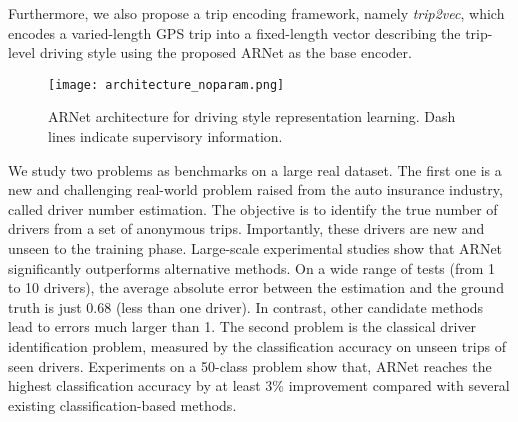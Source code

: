 \documentclass{article}
\begin{document}
Furthermore, we also propose a trip encoding framework, namely \emph{trip2vec}, which encodes a varied-length GPS trip into a fixed-length vector describing the trip-level driving style using the proposed ARNet as the base encoder.

\begin{figure}[!t]
\centering
\texttt{[image: architecture\_noparam.png]}
\vspace{-0.1in}
\caption{ARNet architecture for driving style representation learning.
Dash lines indicate supervisory information.}
\label{fig:architecture}
\vspace{-0.15in}
\end{figure}


We study two problems as benchmarks on a large real dataset.
The first one is a new and challenging real-world problem raised from the auto insurance industry, called driver number estimation.
The objective is to identify the true number of drivers from a set of anonymous trips.
Importantly, these drivers are new and unseen to the training phase.
Large-scale experimental studies show that ARNet significantly outperforms alternative methods.
On a wide range of tests (from 1 to 10 drivers), the average absolute error between the estimation and the ground truth is just 0.68 (less than one driver). In contrast, other candidate methods lead to errors much larger than 1.
The second problem is the classical driver identification problem, measured by the classification accuracy on unseen trips of seen drivers. Experiments on a 50-class problem show that, ARNet reaches the highest classification accuracy by at least 3\% improvement compared with several existing classification-based methods.%
\end{document}
